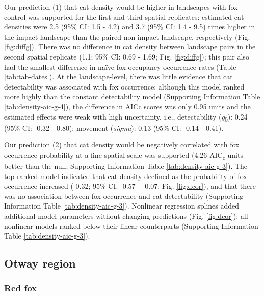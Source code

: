\documentclass[preprint, 3p, authoryear]{elsarticle} %
\begin{document}
Our prediction (1) that cat density would be higher in landscapes with fox control was supported for the first and third spatial replicates: estimated cat densities were 2.5 (95\% CI: 1.5 - 4.2) and 3.7 (95\% CI: 1.4 - 9.5) times higher in the impact landscape than the paired non-impact landscape, respectively (Fig. \ref{fig:diffg}). There was no difference in cat density between landscape pairs in the second spatial replicate (1.1; 95\% CI: 0.69 - 1.69; Fig. \ref{fig:diffg}); this pair also had the smallest difference in naïve fox occupancy occurrence rates (Table \ref{tab:tab-dates}). At the landscape-level, there was little evidence that cat detectability was associated with fox occurrence; although this model ranked more highly than the constant detectability model (Supporting Information Table \ref{tab:density-aic-g-4}), the difference in AICc scores was only 0.95 units and the estimated effects were weak with high uncertainty, i.e., detectability (\emph{g}\textsubscript{0}): 0.24 (95\% CI: -0.32 - 0.80); movement (\emph{sigma}): 0.13 (95\% CI: -0.14 - 0.41).

Our prediction (2) that cat density would be negatively correlated with fox occurrence probability at a fine spatial scale was supported (4.26 AIC\textsubscript{c} units better than the null; Supporting Information Table \ref{tab:density-aic-g-3}). The top-ranked model indicated that cat density declined as the probability of fox occurrence increased (-0.32; 95\% CI: -0.57 - -0.07; Fig. \ref{fig:dcor}), and that there was no association between fox occurrence and cat detectability (Supporting Information Table \ref{tab:density-aic-g-3}). Nonlinear regression splines added additional model parameters without changing predictions (Fig. \ref{fig:dcor}); all nonlinear models ranked below their linear counterparts (Supporting Information Table \ref{tab:density-aic-g-3}).

\hypertarget{otway-region}{%
\subsection{Otway region}\label{otway-region}}

\hypertarget{red-fox-1}{%
\subsubsection{Red fox}\label{red-fox-1}}
\end{document}
